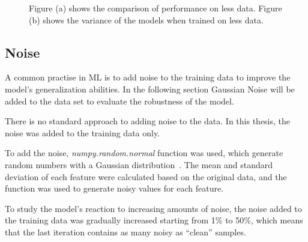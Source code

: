 \begin{figure}[H]
\begin{tcolorbox}[arc=0pt,boxrule=0.5pt]
\begin{subfigure}{0.4\textwidth}
            \caption{}
            \label{fig:second}
        \end{subfigure}
        \hfill
        \label{fig:results-missing-values}
    \end{tcolorbox}
    \caption{Figure (a) shows the comparison of performance on less data. Figure (b) shows the
    variance of the models when trained on less data.}
\end{figure}


%

\subsection{Noise}\label{subsec:noise}
A common practise in \ac{ML} is to add noise to the training data to improve
the model's generalization abilities.
In the following section Gaussian Noise will be added to the data set to evaluate the robustness
of the model.

There is no standard approach to adding noise to the data.
In this thesis, the noise was added to the training data only.

To add the noise, \textit{numpy.random.normal} function was used, which
generate random numbers with a Gaussian distribution~\cite{scikit-learn}.
The mean and standard deviation of each feature were calculated based on the
original data, and the function was used to generate noisy values for each feature.

To study the model's reaction to increasing amounts of noise, the noise added
to the training data was gradually increased starting from 1\% to 50\%, which means that the
last iteration contains as many noisy as ``clean'' samples.

